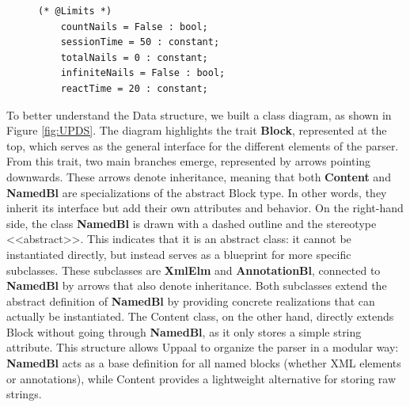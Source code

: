 \begin{figure}[H]
    \centering
    \begin{lstlisting}[language=UPPAAL, caption={Annotation Block rewritten with new values}, label={lst:uppaal_example}]
(* @Limits *)
    countNails = False : bool;
    sessionTime = 50 : constant;
    totalNails = 0 : constant;
    infiniteNails = False : bool;
    reactTime = 20 : constant;
    \end{lstlisting}
\end{figure}



To better understand the Data structure, we built a class diagram, as shown in Figure \ref{fig:UPDS}. The diagram highlights the trait \textbf{Block}, represented at the top, which serves as the general interface for the different elements of the parser. From this trait, two main branches emerge, represented by arrows pointing downwards. These arrows denote inheritance, meaning that both \textbf{Content} and \textbf{NamedBl} are specializations of the abstract Block type. In other words, they inherit its interface but add their own attributes and behavior. On the right-hand side, the class \textbf{NamedBl} is drawn with a dashed outline and the stereotype <<abstract>>. This indicates that it is an abstract class: it cannot be instantiated directly, but instead serves as a blueprint for more specific subclasses. These subclasses are \textbf{XmlElm} and \textbf{AnnotationBl}, connected to \textbf{NamedBl} by arrows that also denote inheritance. Both subclasses extend the abstract definition of \textbf{NamedBl} by providing concrete realizations that can actually be instantiated. The Content class, on the other hand, directly extends Block without going through \textbf{NamedBl}, as it only stores a simple string attribute. This structure allows Uppaal to organize the parser in a modular way: \textbf{NamedBl} acts as a base definition for all named blocks (whether XML elements or annotations), while Content provides a lightweight alternative for storing raw strings.

